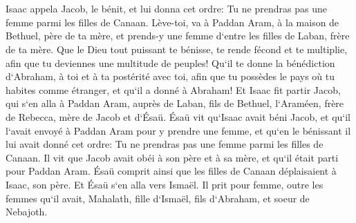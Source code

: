 \chapter{}

\verse Isaac appela Jacob, le bénit, et lui donna cet ordre: Tu ne prendras pas une femme parmi les filles de Canaan. 
\verse Lève-toi, va à Paddan Aram, à la maison de Bethuel, père de ta mère, et prends-y une femme d`entre les filles de Laban, frère de ta mère. 
\verse Que le Dieu tout puissant te bénisse, te rende fécond et te multiplie, afin que tu deviennes une multitude de peuples! 
\verse Qu`il te donne la bénédiction d`Abraham, à toi et à ta postérité avec toi, afin que tu possèdes le pays où tu habites comme étranger, et qu`il a donné à Abraham! 
\verse Et Isaac fit partir Jacob, qui s`en alla à Paddan Aram, auprès de Laban, fils de Bethuel, l`Araméen, frère de Rebecca, mère de Jacob et d`Ésaü. 
\verse Ésaü vit qu`Isaac avait béni Jacob, et qu`il l`avait envoyé à Paddan Aram pour y prendre une femme, et qu`en le bénissant il lui avait donné cet ordre: Tu ne prendras pas une femme parmi les filles de Canaan. 
\verse Il vit que Jacob avait obéi à son père et à sa mère, et qu`il était parti pour Paddan Aram. 
\verse Ésaü comprit ainsi que les filles de Canaan déplaisaient à Isaac, son père. 
\verse Et Ésaü s`en alla vers Ismaël. Il prit pour femme, outre les femmes qu`il avait, Mahalath, fille d`Ismaël, fils d`Abraham, et soeur de Nebajoth. 
